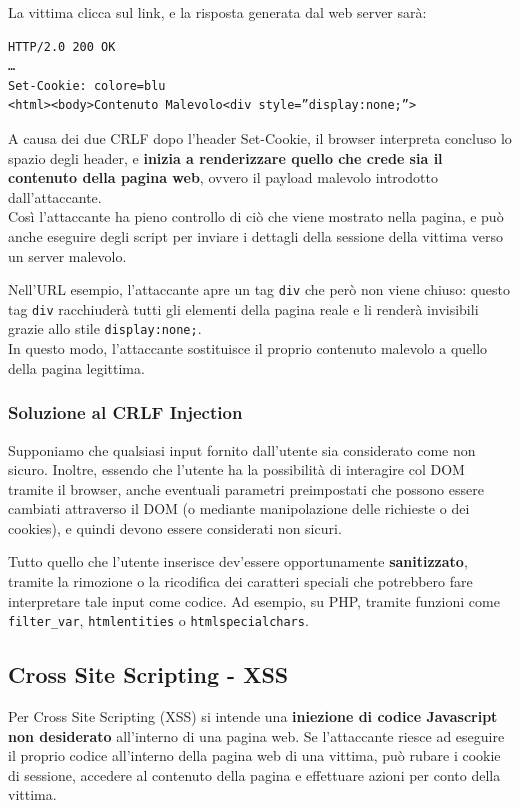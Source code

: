 \documentclass{article}
\begin{document}
La vittima clicca sul link, e la risposta generata dal web server sarà:

\begin{verbatim}
HTTP/2.0 200 OK
…
Set-Cookie: colore=blu
<html><body>Contenuto Malevolo<div style=”display:none;”>
\end{verbatim}

A causa dei due CRLF dopo l’header Set-Cookie, il browser interpreta concluso lo spazio degli header, e \textbf{inizia a renderizzare quello che crede sia il contenuto della pagina web}, ovvero il payload malevolo
introdotto dall’attaccante.\\ Così l'attaccante ha pieno controllo di ciò che viene mostrato nella pagina, e può anche eseguire degli script per inviare i dettagli della sessione della vittima verso un server malevolo.

Nell'URL esempio, l’attaccante apre un tag \verb|div| che però non viene chiuso: questo tag \verb|div| racchiuderà tutti gli elementi della pagina reale e li renderà invisibili grazie allo stile \verb|display:none;|.\\ In questo modo, l’attaccante sostituisce il proprio contenuto malevolo a quello della pagina legittima. 

\subsubsection{Soluzione al CRLF Injection}
Supponiamo che qualsiasi input fornito dall'utente sia considerato come non sicuro. Inoltre, essendo che l’utente ha la possibilità di interagire col DOM tramite il browser, anche eventuali parametri preimpostati che possono essere cambiati attraverso il DOM (o mediante manipolazione delle richieste o dei cookies), e quindi devono essere considerati non sicuri.

Tutto quello che l'utente inserisce dev'essere opportunamente \textbf{sanitizzato}, tramite la rimozione o la ricodifica dei caratteri speciali che potrebbero fare interpretare tale input come codice. Ad esempio, su PHP, tramite funzioni come \verb|filter_var|, \verb|htmlentities| o \verb|htmlspecialchars|.

\newpage

\subsection{Cross Site Scripting - XSS}
Per Cross Site Scripting (XSS) si intende una \textbf{iniezione di codice Javascript non desiderato} all’interno di una pagina web. Se
l’attaccante riesce ad eseguire il proprio codice all’interno della pagina web di una vittima, può rubare i cookie di sessione,
accedere al contenuto della pagina e effettuare azioni per conto della vittima. 
\end{document}
